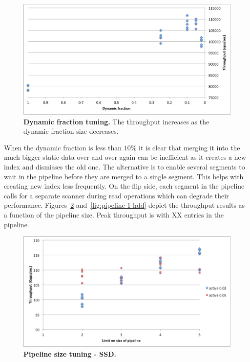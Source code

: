 {\begin{figure}[htb]
\includegraphics[width=\figw]{Figs/dynamic-fraction-1.png}
\caption{{\bf Dynamic fraction tuning.} The throughput increases as the dynamic fraction size decreases.
}
\label{fig:dynamic-fraction}
\end{figure}

When the dynamic fraction is less than $10\%$ it is clear that merging it into the much bigger static data over and over again can be inefficient as it creates a new index and dismisses the old one. 
The alternative is to enable several segments to wait in the pipeline before they are merged to a single segment. This helps with creating new index less frequently.
On the flip side, each segment in the pipeline calls for a separate scanner during read operations which can degrade their performance.
Figures~\ref{fig:pipeline-1-ssd} and~\ref{fig:pipeline-1-hdd} depict the throughput results as a function of the pipeline size. Peak throughput is with XX entries in the pipeline.

\begin{figure}[htb]
\includegraphics[width=\figw]{Figs/pipeline-1-ssd.png}
\caption{{\bf Pipeline size tuning - SSD.} 
}
\label{fig:pipeline-1-ssd}
\end{figure}

}
